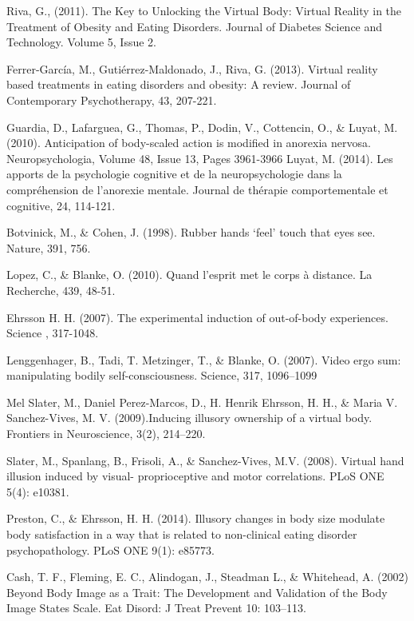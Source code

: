 \begin{thebibliography}{10}

  	Riva, G., (2011). The Key to Unlocking the Virtual Body: Virtual Reality in the Treatment of Obesity and Eating Disorders. Journal of Diabetes Science and Technology.
  	Volume 5, Issue 2.
  			
	Ferrer-García, M., Gutiérrez-Maldonado, J., Riva, G. (2013). Virtual reality based treatments in eating disorders and obesity: A review.  Journal of Contemporary Psychotherapy, 43, 207-221.
	
 	Guardia, D., Lafarguea, G., Thomas, P., Dodin, V., Cottencin, O., \& Luyat, M. (2010).
 	Anticipation of body-scaled action is modified in anorexia nervosa.
 	Neuropsychologia, Volume 48, Issue 13, Pages 3961-3966
 	Luyat, M. (2014). Les apports de la psychologie cognitive et de la
 	neuropsychologie dans la compréhension de l'anorexie mentale. Journal de
 	thérapie comportementale et cognitive, 24, 114-121.
 	
 	Botvinick, M., \& Cohen, J. (1998).
 	Rubber hands ‘feel’
 	touch that eyes see. Nature, 391, 756.
 	
  	
 	Lopez, C., \& Blanke, O. (2010). Quand l'esprit met le corps à distance. La
 	Recherche, 439, 48-51.
 	
 	Ehrsson H. H. (2007). The experimental induction of out-of-body experiences.
 	Science , 317-1048.
 
 	Lenggenhager, B., Tadi, T. Metzinger, T., \& Blanke, O. (2007). Video ergo sum: manipulating
 	bodily self-consciousness. Science, 317, 1096–1099
 	
 
  	Mel Slater, M., Daniel Perez-Marcos, D., H. Henrik Ehrsson, H. H., \&
  	Maria V. Sanchez-Vives, M. V. (2009).Inducing illusory ownership of a virtual body.
  	 Frontiers in Neuroscience, 3(2), 214–220.
  	 
  Slater, M., Spanlang, B., Frisoli, A.,
  \& Sanchez-Vives, M.V. (2008).
  Virtual hand illusion induced by
  visual- proprioceptive and motor
  correlations. PLoS ONE 5(4): e10381.
   	
  	Preston, C., \& Ehrsson, H. H. (2014). Illusory changes in body size modulate body
  	satisfaction in a way that is related to non-clinical eating disorder
  	psychopathology. PLoS ONE 9(1): e85773.
  	
 	Cash, T. F., Fleming, E. C., Alindogan, J., Steadman L., \& Whitehead, A. (2002) Beyond
 	Body Image as a Trait: The Development and Validation of the Body Image
 	States Scale. Eat Disord: J Treat Prevent 10: 103–113.
 	

\end{thebibliography}
